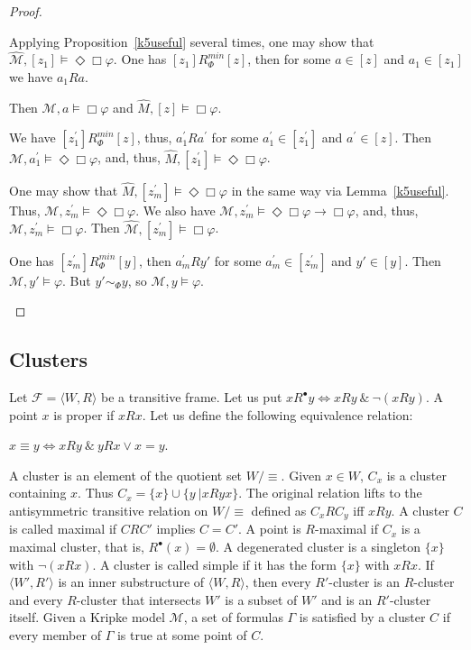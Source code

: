 \documentclass[a4paper]{article}
\theoremstyle{defin}
\theoremstyle{theorem}
\theoremstyle{prop}
\theoremstyle{lemma}
\theoremstyle{ex}
\theoremstyle{col}
\begin{document}
\begin{proof}
\begin{enumerate}
  Applying Proposition~\ref{k5useful} several times, one may show that $\widehat{\mathcal{M}}, [z_1] \models \Diamond \Box \varphi$.
  One has $[z_1] R^{min}_{\Phi} [z]$, then for some $a \in [z]$ and $a_1 \in [z_1]$ we have $a_1 R a$.

  Then $\mathcal{M}, a \models \Box \varphi$ and $\widehat{M}, [z] \models \Box \varphi$.

  We have $[z_1^{'}] R^{min}_{\Phi} [z]$, thus, $a_1^{'} R a^{'}$ for some $a_1^{'} \in [z_1^{'}]$ and $a^{'} \in [z]$. Then
  $\mathcal{M}, a_1^{'} \models \Diamond \Box \varphi$, and, thus, $\widehat{M}, [z_1^{'}] \models \Diamond \Box \varphi$.

  One may show that $\widehat{M}, [z_{m}^{'}] \models \Diamond \Box \varphi$ in the same way via Lemma~\ref{k5useful}. Thus, $\mathcal{M}, z_{m}^{'} \models \Diamond \Box \varphi$. We also have $\mathcal{M}, z_{m}^{'} \models \Diamond \Box \varphi \to \Box \varphi$, and, thus,
  $\mathcal{M}, z_{m}^{'} \models \Box \varphi$. Then $\widehat{\mathcal{M}}, [z_m^{'}] \models \Box \varphi$.

  One has $[z_m^{'}] R^{min}_{\Phi} [y]$, then $a_m^{'} R y'$ for some $a_m^{'} \in [z_m^{'}]$ and $y' \in [y]$. Then $\mathcal{M}, y' \models \varphi$. But $y' \sim_{\Phi} y$, so $\mathcal{M}, y \models \varphi$.
  \end{enumerate}
\end{proof}


\subsection{Clusters}

Let $\mathcal{F} = \langle W, R \rangle$ be a transitive frame.
Let us put $x R^{\bullet} y \Leftrightarrow x R y \: \& \: \neg (x R y)$. A point $x$ is proper if $x R x$. Let us define the following
equivalence relation:

\begin{center}
  $x \equiv y \Leftrightarrow x R y \: \& \: y R x \lor x = y$.
\end{center}
A cluster is an element of the quotient set $W / \equiv$. Given $x \in W$, $C_x$ is a cluster containing $x$. Thus $C_x =
\{ x\} \cup \{ y \: | x R y x \}$. The original relation lifts to the antisymmetric transitive relation on $W / \equiv$ defined as
$C_x R C_y$ iff $x R y$. A cluster $C$ is called maximal if $C R C'$ implies $C = C'$. A point is $R$-maximal if $C_x$ is a maximal cluster,
that is, $R^{\bullet}(x) = \emptyset$. A degenerated cluster is a singleton $\{ x \}$ with $\neg (x R x)$. A cluster is called simple if it has the form $\{ x \}$ with $x R x$. If $\langle W', R' \rangle$ is an inner substructure of $\langle W, R \rangle$, then every $R'$-cluster is an $R$-cluster and every $R$-cluster that intersects $W'$ is a subset of $W'$ and is an $R'$-cluster itself. Given a Kripke model $\mathcal{M}$, a set of formulas $\Gamma$ is satisfied by a cluster $C$ if every member of $\Gamma$ is true at some point of $C$.
\end{document}
